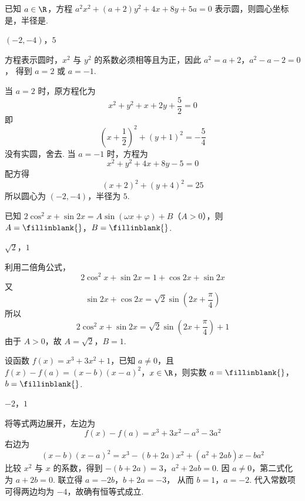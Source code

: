 \begin{problem}
已知 \(a\in\R\)，方程 \(a^2x^2+(a+2)y^2+4x+8y+5a=0\) 表示圆，则圆心坐标是\fillinblank{}，半径是\fillinblank{}.
\end{problem}

\begin{answer}
\((-2,-4)\)，\(5\)
\end{answer}

\begin{solution}
方程表示圆时，\(x^2\) 与 \(y^2\) 的系数必须相等且为正，因此
\(a^2=a+2\)，\(a^2-a-2=0\)，
得到 \(a=2\) 或 \(a=-1\).

当 \(a=2\) 时，原方程化为
\[
x^2+y^2+x+2y+\frac52=0
\]
即
\[
\left(x+\frac12\right)^2+(y+1)^2=-\frac54
\]
没有实圆，舍去. 当 \(a=-1\) 时，方程为
\[
x^2+y^2+4x+8y-5=0
\]
配方得
\[
(x+2)^2+(y+4)^2=25
\]
所以圆心为 \((-2,-4)\)，半径为 \(5\).
\end{solution}

\begin{problem}
已知 \(2\cos^2x+\sin2x=A\sin(\omega x+\varphi)+B\)（\(A>0\)），则 \(A=\fillinblank{}\)，\(B=\fillinblank{}\).
\end{problem}

\begin{answer}
\(\sqrt2\)，\(1\)
\end{answer}

\begin{solution}
利用二倍角公式，
\[
2\cos^2x+\sin2x=1+\cos2x+\sin2x
\]
又
\[
\sin2x+\cos2x=\sqrt2\sin\left(2x+\frac\pi4\right)
\]
所以
\[
2\cos^2x+\sin2x=\sqrt2\sin\left(2x+\frac\pi4\right)+1
\]
由于 \(A>0\)，故 \(A=\sqrt2\)，\(B=1\).
\end{solution}

\begin{problem}
设函数 \(f(x)=x^3+3x^2+1\)，已知 \(a\ne0\)，且 \(f(x)-f(a)=(x-b)(x-a)^2\)，\(x\in\R\)，则实数 \(a=\fillinblank{}\)，\(b=\fillinblank{}\).
\end{problem}

\begin{answer}
\(-2\)，\(1\)
\end{answer}

\begin{solution}
将等式两边展开，左边为
\[
f(x)-f(a)=x^3+3x^2-a^3-3a^2
\]
右边为
\[
(x-b)(x-a)^2=x^3-(b+2a)x^2+(a^2+2ab)x-ba^2
\]
比较 \(x^2\) 与 \(x\) 的系数，得到
\(-(b+2a)=3\)，\(a^2+2ab=0\).
因 \(a\ne0\)，第二式化为 \(a+2b=0\). 联立得
\(a=-2b\)，\(b+2a=-3\)，
从而 \(b=1\)，\(a=-2\). 代入常数项可得两边均为 \(-4\)，故确有恒等式成立.
\end{solution}

